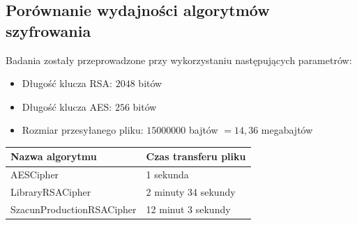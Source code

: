 \documentclass{article}
\begin{document}
  \subsection{Porównanie wydajności algorytmów szyfrowania}
    Badania zostały przeprowadzone przy wykorzystaniu następujących parametrów:
    \begin{itemize}
      \item Długość klucza RSA: \( 2048 \) bitów
      \item Długość klucza AES: \( 256 \) bitów
      \item Rozmiar przesyłanego pliku: \( 15000000 \) bajtów \( = 14,36 \) megabajtów
    \end{itemize}

    \begin{center}
      \begin{tabular}{ | l | l |}
      \hline
      Nazwa algorytmu & Czas transferu pliku \\ \hline
      AESCipher & 1 sekunda \\ \hline
      LibraryRSACipher & 2 minuty 34 sekundy \\ \hline
      SzacunProductionRSACipher & 12 minut 3 sekundy  \\ \hline
      \end{tabular}
    \end{center}
\end{document}
